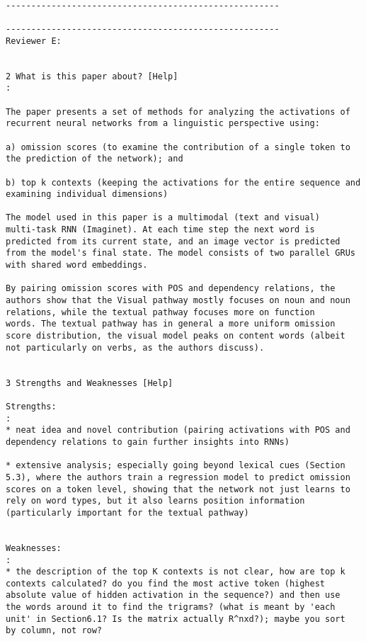 \begin{verbatim}

------------------------------------------------------

------------------------------------------------------
Reviewer E:


2 What is this paper about? [Help]
: 

The paper presents a set of methods for analyzing the activations of
recurrent neural networks from a linguistic perspective using:

a) omission scores (to examine the contribution of a single token to
the prediction of the network); and

b) top k contexts (keeping the activations for the entire sequence and
examining individual dimensions)

The model used in this paper is a multimodal (text and visual)
multi-task RNN (Imaginet). At each time step the next word is
predicted from its current state, and an image vector is predicted
from the model's final state. The model consists of two parallel GRUs
with shared word embeddings.

By pairing omission scores with POS and dependency relations, the
authors show that the Visual pathway mostly focuses on noun and noun
relations, while the textual pathway focuses more on function
words. The textual pathway has in general a more uniform omission
score distribution, the visual model peaks on content words (albeit
not particularly on verbs, as the authors discuss).


3 Strengths and Weaknesses [Help]

Strengths:
: 
* neat idea and novel contribution (pairing activations with POS and
dependency relations to gain further insights into RNNs)

* extensive analysis; especially going beyond lexical cues (Section
5.3), where the authors train a regression model to predict omission
scores on a token level, showing that the network not just learns to
rely on word types, but it also learns position information
(particularly important for the textual pathway)


Weaknesses:
: 
* the description of the top K contexts is not clear, how are top k
contexts calculated? do you find the most active token (highest
absolute value of hidden activation in the sequence?) and then use
the words around it to find the trigrams? (what is meant by 'each
unit' in Section6.1? Is the matrix actually R^nxd?); maybe you sort
by column, not row? 

\end{verbatim}  
